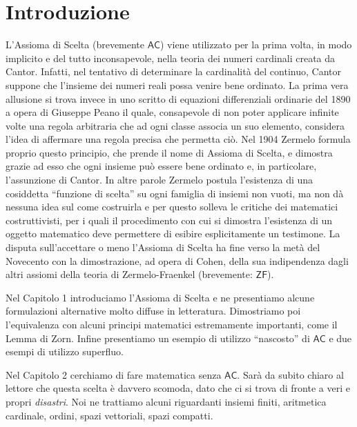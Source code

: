 \documentclass[12pt,a4paper]{report}
\theoremstyle{definition}
\theoremstyle{num.custom-title}
\newcommand{\AC}{\ensuremath{\mathsf{AC}}\xspace}
\newcommand{\ZF}{\ensuremath{\mathsf{ZF}}\xspace}
\begin{document}



\newpage

\tableofcontents


\chapter*{Introduzione} 



L'Assioma di Scelta (brevemente \AC) viene utilizzato per la prima volta, in modo implicito e del tutto inconsapevole, nella teoria dei numeri cardinali creata da Cantor. Infatti, nel tentativo di determinare la cardinalità del continuo, Cantor suppone che l'insieme dei numeri reali possa venire bene ordinato. La prima vera allusione si trova invece in uno scritto di equazioni differenziali ordinarie del 1890 a opera di Giuseppe Peano il quale, consapevole di non poter applicare infinite volte una regola arbitraria che ad ogni classe associa un suo elemento, considera l'idea di affermare una regola precisa che permetta ciò. Nel 1904 Zermelo formula proprio questo principio, che prende il nome di Assioma di Scelta, e dimostra grazie ad esso che ogni insieme può essere bene ordinato e, in particolare, l'assunzione di Cantor. In altre parole Zermelo postula l'esistenza di una cosiddetta ``funzione di scelta'' su ogni famiglia di insiemi non vuoti, ma non dà nessuna idea sul come costruirla e per questo solleva le critiche dei matematici costruttivisti, per i quali il procedimento con cui si dimostra l'esistenza di un oggetto matematico deve permettere di esibire esplicitamente un testimone. La disputa sull'accettare o meno l'Assioma di Scelta ha fine verso la metà del Novecento con la dimostrazione, ad opera di Cohen, della sua indipendenza dagli altri assiomi della teoria di Zermelo-Fraenkel (brevemente: \ZF).

Nel Capitolo 1 introduciamo l'Assioma di Scelta e ne presentiamo alcune formulazioni alternative molto diffuse in letteratura. Dimostriamo poi l'equivalenza con alcuni principi matematici estremamente importanti, come il Lemma di Zorn. Infine presentiamo un esempio di utilizzo ``nascosto'' di \AC e due esempi di utilizzo superfluo.

Nel Capitolo 2 cerchiamo di fare matematica senza \AC. Sarà da subito chiaro al lettore che questa scelta è davvero scomoda, dato che ci si trova di fronte a veri e propri \emph{disastri}. Noi ne trattiamo alcuni riguardanti insiemi finiti, aritmetica cardinale, ordini, spazi vettoriali, spazi compatti.
\end{document}

